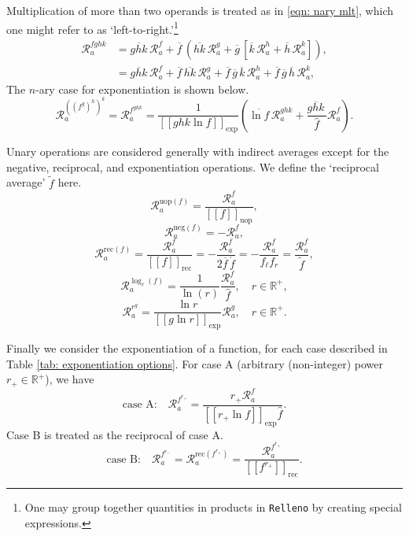 \documentclass[10pt]{article}
\newcommand{\jr}[2]{\mathcal{R}^{#1}_{#2}}
\newcommand{\rec}{\mathrm{rec}}
\renewcommand{\neg}{\mathrm{neg}}
\newcommand{\uop}{\mathrm{uop}}
\newcommand{\avg}[1]{\overline{#1}\,}
\newcommand{\harmavg}[1]{\acute{#1}}
\newcommand{\invavg}[1]{\widetilde{#1}}
\newcommand{\logavg}[1]{\widehat{#1}}
\newcommand{\spavg}[2]{\left[\left[#1\right]\right]_{\mathrm{#2}}}
\newcommand{\Relleno}{\texttt{Relleno}}
\begin{document}
Multiplication of more than two operands is treated as in \eqref{eqn: nary mlt}, which one might refer to as `left-to-right.'\footnote{
One may group together quantities in products in \Relleno{} by creating special expressions.}
\begin{equation}
	\begin{aligned}
		\jr{fghk}{a} &= \avg{ghk}\jr{f}{a} + \avg{f}\left(\avg{hk}\jr{g}{a} + \avg{g}\left[\avg{k}\jr{h}{a} + \avg{h}\jr{k}{a}\right]\right), \\
				 &= \avg{ghk}\jr{f}{a} + \avg{f}\avg{hk}\jr{g}{a} + \avg{f}\avg{g}\avg{k}\jr{h}{a} + \avg{f}\avg{g}\avg{h}\jr{k}{a},
	\end{aligned}
\end{equation}
The $n$-ary case for exponentiation is shown below.
\begin{equation}
	\jr{((f^g)^h)^k}{a} = \jr{f^{ghk}}{a} = \frac{1}{\spavg{ghk\ln f}{\exp}}\left(\avg{\ln f}\jr{ghk}{a} + \frac{\avg{ghk}}{\logavg{f}}\jr{f}{a}\right).
\end{equation}

Unary operations are considered generally with indirect averages except for the negative, reciprocal, and exponentiation operations.
We define the `reciprocal average' $\invavg{f}$ here.
\begin{equation}
	\jr{\uop(f)}{a} = \frac{\jr{f}{a}}{\spavg{f}{\uop}},
\end{equation}
\begin{equation}
	\jr{\neg(f)}{a} = -\jr{f}{a},
\end{equation}
\begin{equation}
	\jr{\rec(f)}{a} = \frac{\jr{f}{a}}{\spavg{f}{\rec}} = -\frac{\jr{f}{a}}{2\avg{f}\harmavg{f}} = -\frac{\jr{f}{a}}{f_\ell f_r} = \frac{\jr{f}{a}}{\invavg{f}},
\end{equation}
\begin{equation}
	\jr{\log_r(f)}{a} = \frac{1}{\ln(r)}\frac{\jr{f}{a}}{\logavg{f}}, \quad r\in\mathbb{R}^+,
\end{equation}
\begin{equation}
	\jr{r^g}{a} = \frac{\ln r}{\spavg{g\ln r}{\exp}}\jr{g}{a}, \quad r\in\mathbb{R}^+.
\end{equation}

Finally we consider the exponentiation of a function, for each case described in Table \ref{tab: exponentiation options}.
For case A (arbitrary (non-integer) power $r_+\in\mathbb{R}^+$), we have
\begin{equation}
	\text{case A:} \quad \jr{f^{r_+}}{a} = \frac{r_+ \jr{f}{a}}{\spavg{r_+\ln f}{\exp}\logavg{f}}.
\end{equation}
Case B is treated as the reciprocal of case A.
\begin{equation}
	\text{case B:} \quad \jr{f^{r_-}}{a} = \jr{\rec(f^{r_+})}{a} = \frac{\jr{f^{r_+}}{a}}{\spavg{f^{r_+}}{\rec}}.
\end{equation}
\end{document}
